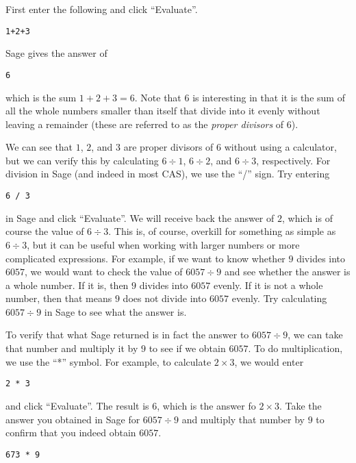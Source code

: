 \documentclass[12pt]{amsart}
\theoremstyle{definition}
\theoremstyle{definition}
\begin{document}
First enter the following and click ``Evaluate''.

\begin{verbatim}
1+2+3
\end{verbatim}

Sage gives the answer of

\begin{verbatim}6\end{verbatim}

which is the sum $1+2+3=6$. Note that $6$ is interesting in that it is the
sum of all the whole numbers smaller than itself that divide into it evenly
without leaving a remainder (these are referred to as the
\textit{proper divisors} of 6).

We can see that $1$, $2$, and $3$ are proper divisors of 6 without using
a calculator, but we can verify this by calculating $6 \div 1$, $6 \div 2$,
and $6 \div 3$, respectively. For division in Sage (and indeed in most
CAS), we use the ``/'' sign. Try entering

\begin{verbatim}
6 / 3
\end{verbatim}

in Sage and click ``Evaluate''. We will receive back the answer of $2$,
which is of course the value of $6 \div 3$. This is, of course, overkill
for something as simple as $6 \div 3$, but it can be useful when working
with larger numbers or more complicated expressions. For example,
if we want to know whether $9$ divides into $6057$, we would want
to check the value of $6057 \div 9$ and see whether the answer is
a whole number. If it is, then $9$ divides into $6057$ evenly. If it is not
a whole number, then that means $9$ does not divide into $6057$ evenly.
Try calculating $6057 \div 9$ in Sage to see what the answer is.

To verify that what Sage returned is in fact the answer to $6057 \div 9$,
we can take that number and multiply it by $9$ to see if we obtain
$6057$. To do multiplication, we use the ``*'' symbol. For example,
to calculate $2 \times 3$, we would enter

\begin{verbatim}
2 * 3
\end{verbatim}

and click ``Evaluate''. The result is $6$, which is the answer fo $2 \times 3$.
Take the answer you obtained in Sage for $6057 \div 9$ and multiply that
number by $9$ to confirm that you indeed obtain $6057$.

\begin{verbatim}
673 * 9
\end{verbatim}
\end{document}
